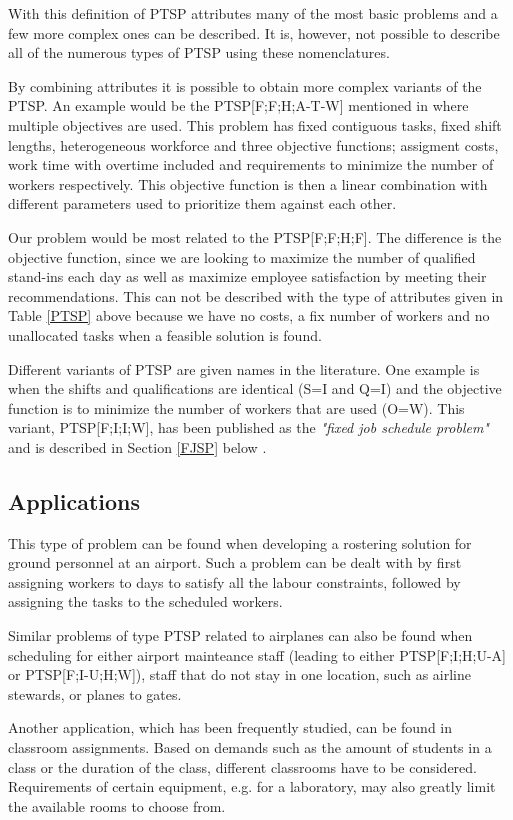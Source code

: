 With this definition of PTSP attributes many of the most basic problems and a few more complex ones can be described. It is, however, not possible to describe all of the numerous types of PTSP using these nomenclatures.

By combining attributes it is possible to obtain more complex variants of the PTSP. An example would be the PTSP[F;F;H;A-T-W] mentioned in \cite{krishnamoorthy_2001} where multiple objectives are used. This problem has fixed contiguous tasks, fixed shift lengths, heterogeneous workforce and three objective functions; assigment costs, work time with overtime included and requirements to minimize the number of workers respectively. This objective function is then a linear combination with different parameters used to prioritize them against each other.

Our problem would be most related to the PTSP[F;F;H;F]. The difference is the objective function, since we are looking to maximize the number of qualified stand-ins each day as well as maximize employee satisfaction by meeting their recommendations. This can not be described with the type of attributes given in Table \ref{PTSP} above because we have no costs, a fix number of workers and no unallocated tasks when a feasible solution is found. 

Different variants of PTSP are given names in the literature. One example is when the shifts and qualifications are identical (S=I and Q=I) and the objective function is to minimize the number of workers that are used (O=W). This variant, PTSP[F;I;I;W], has been published as the \textit{"fixed job schedule problem"} and is described in Section \ref{FJSP} below \cite{krishnamoorthy_2001}.

\subsection{Applications}
This type of problem can be found when developing a rostering solution for ground personnel at an airport. Such a problem can be dealt with by first assigning workers to days to satisfy all the labour constraints, followed by assigning the tasks to the scheduled workers.

Similar problems of type PTSP related to airplanes can also be found when scheduling for either airport mainteance staff (leading to either PTSP[F;I;H;U-A] or PTSP[F;I-U;H;W]), staff that do not stay in one location, such as airline stewards, or planes to gates. 

Another application, which has been frequently studied, can be found in classroom assignments. Based on demands such as the amount of students in a class or the duration of the class, different classrooms have to be considered. Requirements of certain equipment, e.g. for a laboratory, may also greatly limit the available rooms to choose from.


